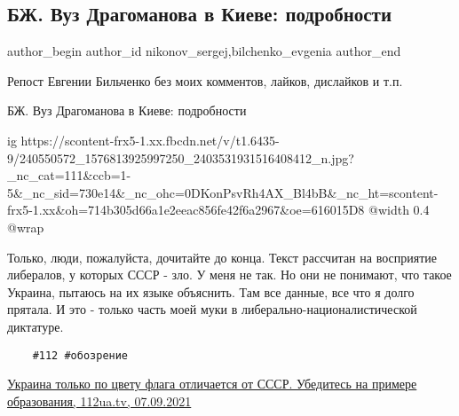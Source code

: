  
 
 
 
 
 
\subsection{БЖ. Вуз Драгоманова в Киеве: подробности}
\label{sec:08_09_2021.fb.nikonov_sergej.6.vuz_dragomanova_bilchenko}
 
\ifcmt
 author_begin
   author_id nikonov_sergej,bilchenko_evgenia
 author_end
\fi

Репост Евгении Бильченко без моих комментов, лайков, дислайков и т.п.

БЖ. Вуз Драгоманова в Киеве: подробности

\ifcmt
  ig https://scontent-frx5-1.xx.fbcdn.net/v/t1.6435-9/240550572_1576813925997250_2403531931516408412_n.jpg?_nc_cat=111&ccb=1-5&_nc_sid=730e14&_nc_ohc=0DKonPsvRh4AX_Bl4bB&_nc_ht=scontent-frx5-1.xx&oh=714b305d66a1e2eeac856fe42f6a2967&oe=616015D8
  @width 0.4
  @wrap \parpic[r]
\fi

Только, люди, пожалуйста, дочитайте до конца. Текст рассчитан на восприятие
либералов, у которых СССР - зло. У меня не так. Но они не понимают, что такое
Украина, пытаюсь на их языке объяснить. Там все данные, все что я долго
прятала. И это - только часть моей муки в либерально-националистической
диктатуре.

\begin{verbatim}
	#112 #обозрение
\end{verbatim}

\href{https://112ua.tv/mnenie/ukraina-tolko-po-cvetu-flaga-otlichaetsya-ot-sssr-ubedites-na-primere-obrazovaniya-590547.html}{%
Украина только по цвету флага отличается от СССР. Убедитесь на примере образования, 112ua.tv, 07.09.2021%
}

